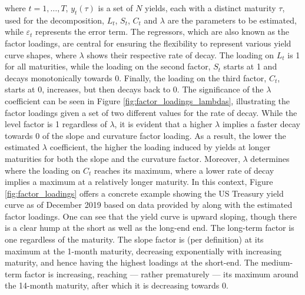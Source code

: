 where $t=1,\ldots, T$, $y_{t}(\tau)$ is a set of $N$ yields, each with a distinct maturity $\tau$, used for the decomposition, $L_{t}$, $S_{t}$, $C_{t}$ and $\lambda$ are the parameters to be estimated, while $\varepsilon_{t}$ represents the error term.
The regressors, which are also known as the factor loadings, are central for ensuring the flexibility to represent various yield curve shapes, where $\lambda$ shows their respective rate of decay.
The loading on  $L_{t}$ is 1 for all maturities,
while the loading on the second factor,  $S_{t}$ starts at 1 and decays monotonically towards 0.
Finally, the loading on the third factor,  $C_{t}$, starts at 0, increases, but then decays back to 0.
The significance of the $\lambda$ coefficient can be seen in Figure \ref{fig:factor_loadings_lambdas}, illustrating the factor loadings given a set of two different values for the rate of decay.
While the level factor is 1 regardless of $\lambda$, it is evident that a higher $\lambda$ implies a faster decay towards 0 of the slope and curvature factor loading. 
As a result, the lower the estimated $\lambda$ coefficient, the higher the loading induced by yields at longer maturities for both the slope and the curvature factor. 
Moreover, $\lambda$ determines where the loading on $C_{t}$ reaches its maximum, where a lower rate of decay implies a maximum at a relatively longer maturity. 
In this context, Figure \ref{fig:factor_loadings} offers a concrete example showing the US Treasury yield curve as of December 2019 based on data provided by \citet{liu2021reconstructing} along with the estimated factor loadings. 
One can see that the yield curve is upward sloping, though there is a clear hump at the short as well as the long-end end.
The long-term factor is one regardless of the maturity.
The slope factor is (per definition) at its maximum at the 1-month maturity, decreasing exponentially with increasing maturity, and hence having the highest loadings at the short-end.  
The medium-term factor is increasing, reaching --- rather prematurely --- its maximum around the 14-month maturity, after which it is decreasing towards 0.

